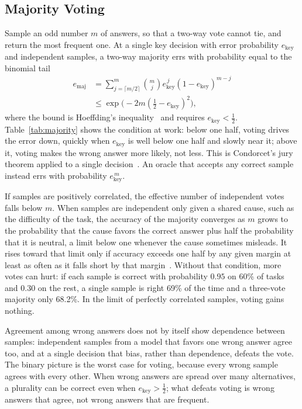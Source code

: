 \documentclass{ieeeaccess}
\begin{document}
\subsection{Majority Voting}
\label{app:majority}
Sample an odd number $m$ of answers, so that a two-way vote cannot tie, and return the most frequent one. At a single key decision with error probability $e_{\text{key}}$ and independent samples, a two-way majority errs with probability equal to the binomial tail
\begin{equation}
\begin{split}
e_{\text{maj}} &= \sum_{j=\lceil m/2\rceil}^{m} \binom{m}{j} e_{\text{key}}^{\,j} (1-e_{\text{key}})^{m-j}\\
&\le \exp\bigl(-2m(\tfrac12 - e_{\text{key}})^2\bigr),
\end{split}
\end{equation}
where the bound is Hoeffding's inequality~\cite{hoeffding1963probability} and requires $e_{\text{key}} < \tfrac12$. Table~\ref{tab:majority} shows the condition at work: below one half, voting drives the error down, quickly when $e_{\text{key}}$ is well below one half and slowly near it; above it, voting makes the wrong answer more likely, not less. This is Condorcet's jury theorem applied to a single decision~\cite{dietrich2023jury}. An oracle that accepts any correct sample instead errs with probability $e_{\text{key}}^{\,m}$.

If samples are positively correlated, the effective number of independent votes falls below $m$. When samples are independent only given a shared cause, such as the difficulty of the task, the accuracy of the majority converges as $m$ grows to the probability that the cause favors the correct answer plus half the probability that it is neutral, a limit below one whenever the cause sometimes misleads. It rises toward that limit only if accuracy exceeds one half by any given margin at least as often as it falls short by that margin~\cite{dietrich2023jury}. Without that condition, more votes can hurt: if each sample is correct with probability $0.95$ on 60\% of tasks and $0.30$ on the rest, a single sample is right 69\% of the time and a three-vote majority only 68.2\%. In the limit of perfectly correlated samples, voting gains nothing.

Agreement among wrong answers does not by itself show dependence between samples: independent samples from a model that favors one wrong answer agree too, and at a single decision that bias, rather than dependence, defeats the vote. The binary picture is the worst case for voting, because every wrong sample agrees with every other. When wrong answers are spread over many alternatives, a plurality can be correct even when $e_{\text{key}} > \tfrac12$; what defeats voting is wrong answers that agree, not wrong answers that are frequent.
\end{document}
